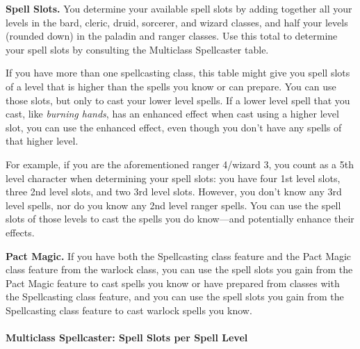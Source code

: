 \documentclass[
]{article}
\begin{document}
\textbf{Spell Slots.} You determine your available spell slots by adding
together all your levels in the bard, cleric, druid, sorcerer, and
wizard classes, and half your levels (rounded down) in the paladin and
ranger classes. Use this total to determine your spell slots by
consulting the Multiclass Spellcaster table.

If you have more than one spellcasting class, this table might give you
spell slots of a level that is higher than the spells you know or can
prepare. You can use those slots, but only to cast your lower level
spells. If a lower level spell that you cast, like \emph{burning hands},
has an enhanced effect when cast using a higher level slot, you can use
the enhanced effect, even though you don't have any spells of that
higher level.

For example, if you are the aforementioned ranger 4/wizard 3, you count
as a 5th level character when determining your spell slots: you have
four 1st level slots, three 2nd level slots, and two 3rd level slots.
However, you don't know any 3rd level spells, nor do you know any 2nd
level ranger spells. You can use the spell slots of those levels to cast
the spells you do know---and potentially enhance their effects.

\textbf{Pact Magic.} If you have both the Spellcasting class feature and
the Pact Magic class feature from the warlock class, you can use the
spell slots you gain from the Pact Magic feature to cast spells you know
or have prepared from classes with the Spellcasting class feature, and
you can use the spell slots you gain from the Spellcasting class feature
to cast warlock spells you know.

\hypertarget{multiclass-spellcaster-spell-slots-per-spell-level}{%
\paragraph{Multiclass Spellcaster: Spell Slots per Spell
Level}\label{multiclass-spellcaster-spell-slots-per-spell-level}}
\end{document}
